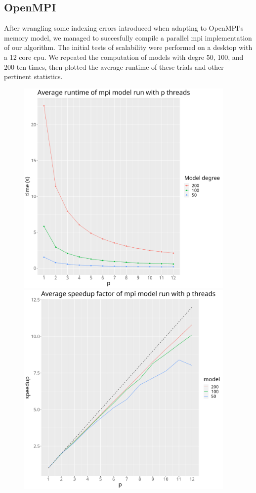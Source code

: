 \documentclass[a4paper]{article}
\theoremstyle{definition}
\begin{document}
\subsection{OpenMPI}
After wrangling some indexing errors introduced when adapting to OpenMPI's memory model, we managed to succesfully compile a parallel mpi implementation
of our algorithm.
The initial tests of scalability were performed on a desktop with a 12 core cpu. We repeated the computation of models with degre 50, 100, and 200 ten times, then 
plotted the average runtime of these trials and other pertinent statistics.


\begin{figure}[h!]
\begin{minipage}{0.45\linewidth}
    \centering
    \includegraphics[width=0.95\textwidth]{media/mpi_runtime.png}
\end{minipage}
\begin{minipage}{0.45\linewidth}
    \centering
    \includegraphics[width=0.95\textwidth]{media/mpi_speedup.png}

\end{minipage}
\end{figure}
\end{document}
